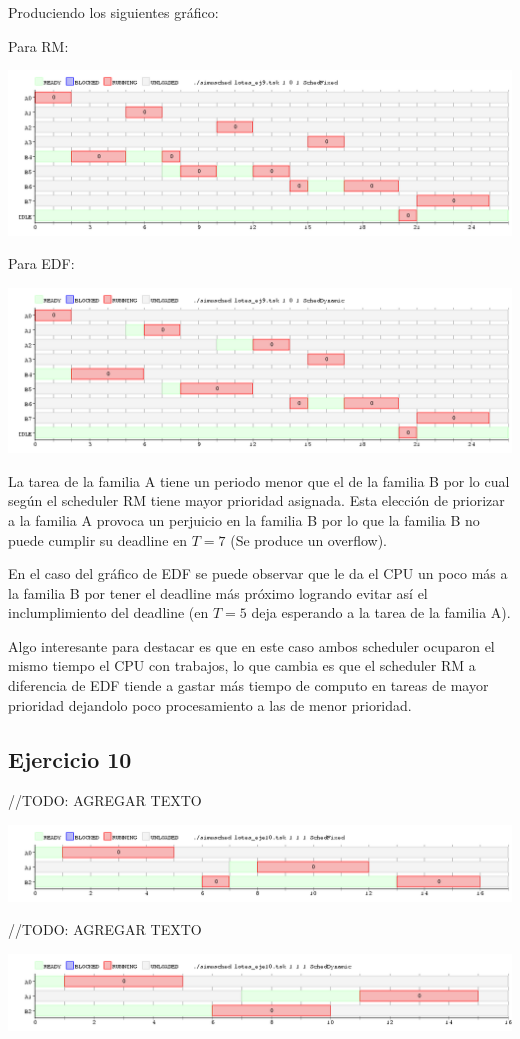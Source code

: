 Produciendo los siguientes gráfico:

Para RM:

\begin{center}
\includegraphics[scale=0.4]{graficos/eje9_fixed.png}
\end{center}

Para EDF:

\begin{center}
\includegraphics[scale=0.4]{graficos/eje9_dynamic.png}
\end{center}

La tarea de la familia A tiene un periodo menor que el de la familia B por lo cual según el scheduler RM tiene mayor prioridad asignada. Esta elección de priorizar a la familia A provoca un perjuicio en la familia B por lo que la familia B no puede cumplir su deadline en $T=7$ (Se produce un overflow).

En el caso del gráfico de EDF se puede observar que le da el CPU un poco más a la familia B por tener el deadline más próximo logrando evitar así el inclumplimiento del deadline (en $T=5$ deja esperando a la tarea de la familia A).

Algo interesante para destacar es que en este caso ambos scheduler ocuparon el mismo tiempo el CPU con trabajos, lo que cambia es que el scheduler RM a diferencia de EDF tiende a gastar más tiempo de computo en tareas de mayor prioridad dejandolo poco procesamiento a las de menor prioridad.

\subsection{Ejercicio 10}
//TODO: AGREGAR TEXTO

\begin{center}
\includegraphics[scale=0.4]{graficos/eje10_Fixed.png}
\end{center}

//TODO: AGREGAR TEXTO
\begin{center}
\includegraphics[scale=0.4]{graficos/eje10_Dynamic.png}
\end{center}
